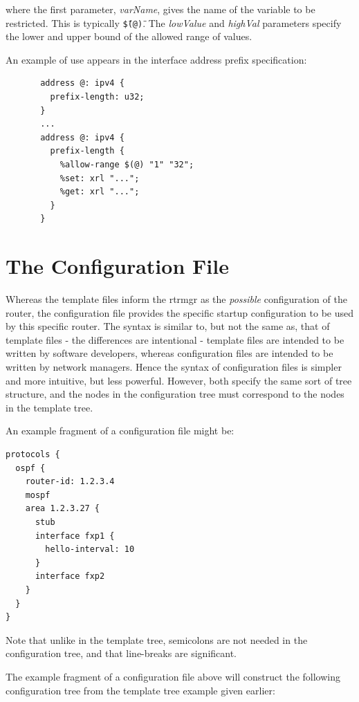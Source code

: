 \documentclass[11pt]{article}
\begin{document}
\noindent where the first parameter, \textit{varName}, gives the name
of the variable to be restricted.  This is typically
\texttt{\"\$(@)\"}.  The {\it lowValue} and {\it highVal} parameters
specify the lower and upper bound of the allowed range of values.

\newpage

An example of use appears in the interface address prefix
specification:

\begin{verbatim}
       address @: ipv4 {
         prefix-length: u32;
       }
       ...
       address @: ipv4 {
         prefix-length {
           %allow-range $(@) "1" "32";
           %set: xrl "...";
           %get: xrl "...";
         }
       }
\end{verbatim}

\newpage

\section{The Configuration File}

Whereas the template files inform the rtrmgr as the {\it possible}
configuration of the router, the configuration file provides the
specific startup configuration to be used by this specific router.
The syntax is similar to, but not the same as, that of template files -
the differences are intentional - template files are intended to be
written by software developers, whereas configuration files are
intended to be written by network managers.  Hence the syntax of
configuration files is simpler and more intuitive, but less powerful.
However, both specify the same sort of tree structure, and the nodes
in the configuration tree must correspond to the nodes in the template
tree.

An example fragment of a configuration file might be:

\begin{verbatim}
protocols {
  ospf {
    router-id: 1.2.3.4
    mospf
    area 1.2.3.27 {
      stub
      interface fxp1 {
        hello-interval: 10
      }
      interface fxp2
    }
  }
}
\end{verbatim}

Note that unlike in the template tree, semicolons are not needed in the
configuration tree, and that line-breaks are significant.

The example fragment of a configuration file above will construct the
following configuration tree from the template tree example given
earlier:
\end{document}
